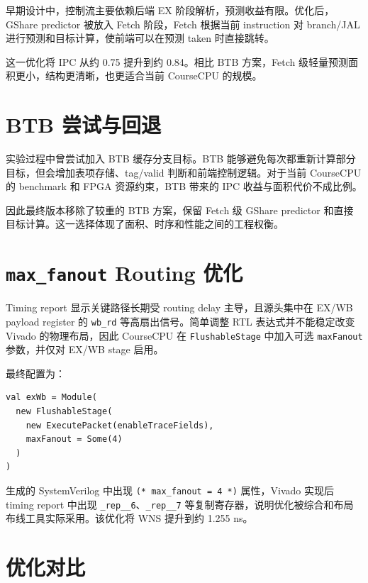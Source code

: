 \documentclass[UTF8,a4paper,12pt]{ctexrep}
\begin{document}
早期设计中，控制流主要依赖后端 EX 阶段解析，预测收益有限。优化后，GShare predictor 被放入 Fetch 阶段，Fetch 根据当前 instruction 对 branch/JAL 进行预测和目标计算，使前端可以在预测 taken 时直接跳转。

这一优化将 IPC 从约 0.75 提升到约 0.84。相比 BTB 方案，Fetch 级轻量预测面积更小，结构更清晰，也更适合当前 CourseCPU 的规模。

\section{BTB 尝试与回退}

实验过程中曾尝试加入 BTB 缓存分支目标。BTB 能够避免每次都重新计算部分目标，但会增加表项存储、tag/valid 判断和前端控制逻辑。对于当前 CourseCPU 的 benchmark 和 FPGA 资源约束，BTB 带来的 IPC 收益与面积代价不成比例。

因此最终版本移除了较重的 BTB 方案，保留 Fetch 级 GShare predictor 和直接目标计算。这一选择体现了面积、时序和性能之间的工程权衡。

\section{\texttt{max\_fanout} Routing 优化}

Timing report 显示关键路径长期受 routing delay 主导，且源头集中在 EX/WB payload register 的 \texttt{wb\_rd} 等高扇出信号。简单调整 RTL 表达式并不能稳定改变 Vivado 的物理布局，因此 CourseCPU 在 \texttt{FlushableStage} 中加入可选 \texttt{maxFanout} 参数，并仅对 EX/WB stage 启用。

最终配置为：

\begin{lstlisting}[language={}]
val exWb = Module(
  new FlushableStage(
    new ExecutePacket(enableTraceFields),
    maxFanout = Some(4)
  )
)
\end{lstlisting}

生成的 SystemVerilog 中出现 \texttt{(* max\_fanout = 4 *)} 属性，Vivado 实现后 timing report 中出现 \texttt{\_rep\_\_6}、\texttt{\_rep\_\_7} 等复制寄存器，说明优化被综合和布局布线工具实际采用。该优化将 WNS 提升到约 1.255 ns。

\section{优化对比}
\end{document}
